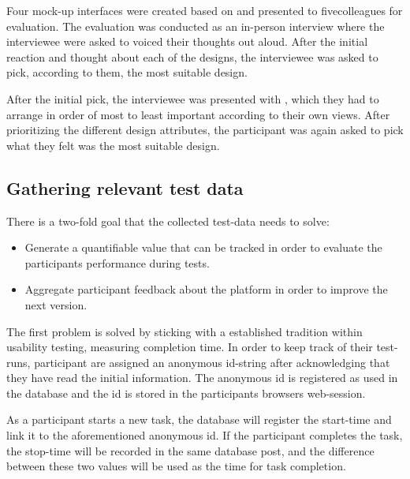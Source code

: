 \documentclass[nofilelist,dvipsnames]{cslthse-msc}
\begin{document}

        Four mock-up interfaces were created based on  and presented to five\checkTruth colleagues for
        evaluation. The evaluation was conducted as an in-person interview
        where the interviewee were asked to voiced their thoughts out aloud.
        After the initial reaction and thought about each of the designs, the
        interviewee was asked to pick, according to them, the most suitable
        design.

        After the initial pick, the interviewee was presented with
        , which they had to arrange
        in order of most to least important according to their own views.
        After prioritizing the different design attributes, the participant was
        again asked to pick what they felt was the most suitable design.



      \subsection{Gathering relevant test data}

        There is a two-fold goal that the collected test-data needs to solve:
        \begin{itemize}
          \item{
            Generate a quantifiable value that can be tracked in order to
            evaluate the participants performance during tests.
          }
          \item{
            Aggregate participant feedback about the platform in order to
            improve the next version.
          }
        \end{itemize}

        The first problem is solved by sticking with a established tradition
        within usability testing\findref\findref, measuring completion time.
        In order to keep track of their test-runs, participant are assigned an
        anonymous id-string after acknowledging that they have read the initial
        information. The anonymous id is registered as used in the database
        and the id is stored in the participants browsers web-session.

        As a participant starts a new task, the database will register the
        start-time and link it to the aforementioned anonymous id. If the
        participant completes the task, the stop-time will be recorded in the
        same database post, and the difference between these two values will be
        used as the time for task completion.
\end{document}
